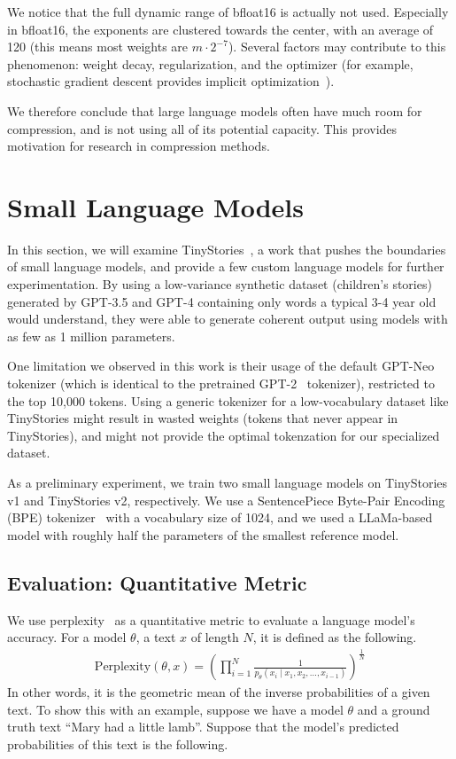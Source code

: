 \documentclass[../main.tex]{subfiles}
\begin{document}
We notice that the full dynamic range of bfloat16 is actually not used. Especially in bfloat16, the exponents are clustered towards the center, with an average of 120 (this means most weights are $m \cdot 2^{-7}$). Several factors may contribute to this phenomenon: weight decay, regularization, and the optimizer (for example, stochastic gradient descent provides implicit optimization~\cite{smithOriginImplicitRegularization2021a}).

We therefore conclude that large language models often have much room for compression, and is not using all of its potential capacity. This provides motivation for research in compression methods.

\section{Small Language Models} \label{sec:slms}

In this section, we will examine TinyStories~\cite{eldanTinyStoriesHowSmall2023d}, a work that pushes the boundaries of small language models, and provide a few custom language models for further experimentation. By using a low-variance synthetic dataset (children's stories) generated by GPT-3.5 and GPT-4 containing only words a typical 3-4 year old would understand, they were able to generate coherent output using models with as few as 1 million parameters.

One limitation we observed in this work is their usage of the default GPT-Neo~\cite{blackGPTNeoLargeScale2021} tokenizer (which is identical to the pretrained GPT-2~\cite{radford2019language} tokenizer), restricted to the top 10,000 tokens. Using a generic tokenizer for a low-vocabulary dataset like TinyStories might result in wasted weights (tokens that never appear in TinyStories), and might not provide the optimal tokenzation for our specialized dataset. 

As a preliminary experiment, we train two small language models on TinyStories v1 and TinyStories v2, respectively. We use a SentencePiece Byte-Pair Encoding (BPE) tokenizer~\cite{kudoSentencePieceSimpleLanguage2018} with a vocabulary size of 1024, and we used a LLaMa-based~\cite{touvronLLaMAOpenEfficient2023c} model with roughly half the parameters of the smallest reference model.

\subsection{Evaluation: Quantitative Metric}
We use perplexity~\cite{jelinekPerplexityMeasureDifficulty1977} as a quantitative metric to evaluate a language model's accuracy. For a model $\theta$, a text $x$ of length $N$, it is defined as the following.
\begin{align}
    \text{Perplexity}(\theta, x) = \left( \prod_{i=1}^N \frac{1}{p_\theta(x_i\mid x_1, x_2, \dots, x_{i-1})} \right)^{\frac1N}
\end{align}
In other words, it is the geometric mean of the inverse probabilities of a given text. To show this with an example, suppose we have a model $\theta$ and a ground truth text ``Mary had a little lamb''. Suppose that the model's predicted probabilities of this text is the following.
\end{document}
